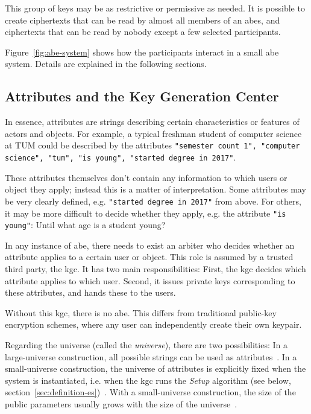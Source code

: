 This group of keys may be as restrictive or permissive as needed.
It is possible to create ciphertexts that can be read by almost all members of an \acrshort{abes}, and ciphertexts that can be read by nobody except a few selected participants.

Figure~\ref{fig:abe-system} shows how the participants interact in a small \acrshort{abe} system.
Details are explained in the following sections.

\subsection{Attributes and the Key Generation Center}\label{sec:kgc}



In essence, attributes are strings describing certain characteristics or features of actors and objects.
For example, a typical freshman student of computer science at TUM could be described by the attributes \texttt{"semester count 1", "computer science", "tum", "is young", "started degree in 2017"}.

These attributes themselves don't contain any information to which users or object they apply; instead this is a matter of interpretation.
Some attributes may be very clearly defined, e.g. \texttt{"started degree in 2017"} from above.
For others, it may be more difficult to decide whether they apply, e.g. the attribute \texttt{"is young"}: Until what age is a student young?

In any instance of \acrshort{abe}, there needs to exist an arbiter who decides whether an attribute applies to a certain user or object.
This role is assumed by a trusted third party, the \acrfull{kgc}.
It has two main responsibilities: First, the \acrshort{kgc} decides which attribute applies to which user.
Second, it issues private keys corresponding to these attributes, and hands these to the users.

Without this \acrshort{kgc}, there is no \acrshort{abe}.
This differs from traditional public-key encryption schemes, where any user can independently create their own keypair.

Regarding the \glsdesc{universe} (called the \emph{\gls{universe}}), there are two possibilities:
In a \gls{large-universe} construction, all possible strings can be used as attributes~\cite{goyal_attribute-based_2006}.
In a \gls{small-universe} construction, the universe of attributes is explicitly fixed when the system is instantiated, i.e. when the \acrshort{kgc} runs the \emph{Setup} algorithm (see below, section~\ref{sec:definition-es})~\cite{goyal_attribute-based_2006}.
With a \gls{small-universe} construction, the size of the public parameters usually grows with the size of the \gls{universe}~\cite{goyal_attribute-based_2006}.


